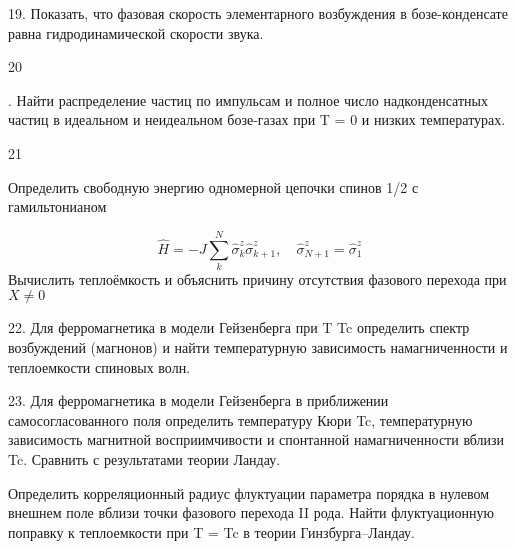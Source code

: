 \documentclass[a4paper,12pt]{article} %
\begin{document}
\begin{task}

19. Показать, что фазовая скорость элементарного возбуждения в бозе-конденсате равна гидродинамической скорости звука.


\end{task}



\begin{task}

20

. Найти распределение частиц по импульсам и полное число надконденсатных частиц в идеальном и неидеальном бозе-газах при T = 0 и низких температурах.


\end{task}



\begin{task}

21

Определить свободную энергию одномерной цепочки спинов 1/2 с гамильтонианом

$$\hat{H}=-J \sum_{k}^{N} \hat{\sigma}_{k}^{z} \hat{\sigma}_{k+1}^{z}, \quad \hat{\sigma}_{N+1}^{z}=\hat{\sigma}_{1}^{z}$$
Вычислить теплоёмкость и объяснить причину отсутствия фазового перехода при $ X\ne 0 $
\end{task}



\begin{task}

22. Для ферромагнетика в модели Гейзенберга при T  Tc определить спектр возбуждений (магнонов) и найти температурную зависимость намагниченности и теплоемкости спиновых волн.

\end{task}



\begin{task}

23. Для ферромагнетика в модели Гейзенберга в приближении самосогласованного поля определить температуру Кюри Tc, температурную зависимость магнитной восприимчивости  и спонтанной намагниченности вблизи Tc. Сравнить с результатами теории Ландау.

\end{task}



\begin{task}

Определить корреляционный радиус флуктуации параметра порядка в нулевом внешнем поле вблизи точки фазового перехода II рода. Найти флуктуационную поправку к теплоемкости при T = Tc в теории Гинзбурга–Ландау.

\end{task}
\end{document}
